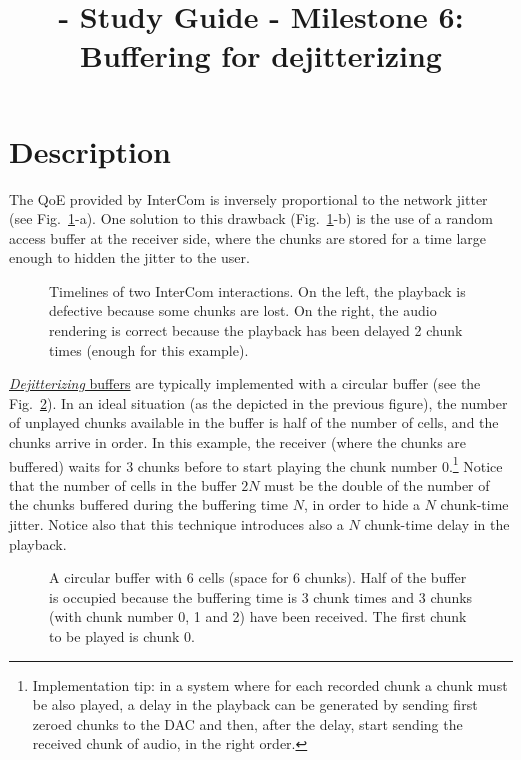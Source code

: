 
\title{\TM - Study Guide - Milestone 6: Buffering for dejitterizing}

\maketitle

\section{Description}

The QoE provided by InterCom is inversely proportional to the network
jitter (see Fig.~\ref{fig:timelines}-a). One solution to this drawback
(Fig.~\ref{fig:timelines}-b) is the use of a random access buffer at
the receiver side, where the chunks are stored for a time large enough
to hidden the jitter to the user.

\begin{figure}
  \begin{center}
  \end{center}
  \caption{Timelines of two InterCom interactions. On the left, the
    playback is defective because some chunks are lost. On the right,
    the audio rendering is correct because the playback has been
    delayed 2 chunk times (enough for this example).}
  \label{fig:timelines}
\end{figure}

\href{https://en.wikipedia.org/wiki/Jitter#Jitter_buffers}{\emph{Dejitterizing}
  buffers} are typically implemented with a circular buffer (see the
Fig.~\ref{fig:circular_buffer}). In an ideal situation (as the
depicted in the previous figure), the number of unplayed chunks
available in the buffer is half of the number of cells, and the chunks
arrive in order. In this example, the receiver (where the chunks are
buffered) waits for 3 chunks before to start playing the chunk number
0.\footnote{Implementation tip: in a system where for each recorded
chunk a chunk must be also played, a delay in the playback can be
generated by sending first zeroed chunks to the DAC and then, after
the delay, start sending the received chunk of audio, in the right
order.} Notice that the number of cells in the buffer $2N$ must be the
double of the number of the chunks buffered during the buffering time
$N$, in order to hide a $N$ chunk-time jitter. Notice also that this
technique introduces also a $N$ chunk-time delay in the playback.

\begin{figure}
  \begin{center}
  \end{center}
  \caption{A circular buffer with 6 cells (space for 6 chunks). Half
    of the buffer is occupied because the buffering time is 3 chunk
    times and 3 chunks (with chunk number 0, 1 and 2) have been
    received. The first chunk to be played is chunk 0.}
  \label{fig:circular_buffer}
\end{figure}


